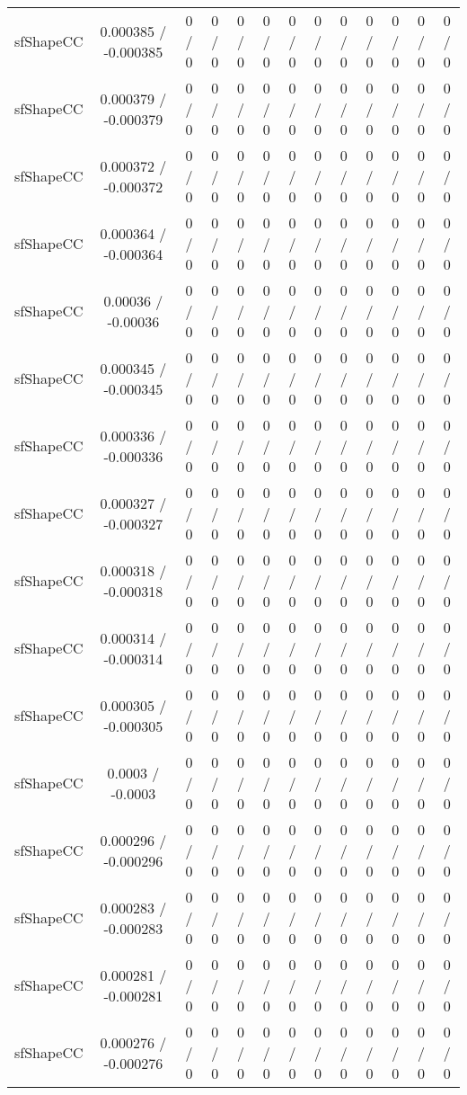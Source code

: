 \documentclass[10pt]{article}
\begin{document}
\begin{table}[htbp]
\begin{center}
\begin{tabular}{|c|c|c|c|c|c|c|c|c|c|c|c|c|}
  sfShapeCC & 0.000385 / -0.000385 & 0 / 0 & 0 / 0 & 0 / 0 & 0 / 0 & 0 / 0 & 0 / 0 & 0 / 0 & 0 / 0 & 0 / 0 & 0 / 0 & 0 / 0 \\ 
  sfShapeCC & 0.000379 / -0.000379 & 0 / 0 & 0 / 0 & 0 / 0 & 0 / 0 & 0 / 0 & 0 / 0 & 0 / 0 & 0 / 0 & 0 / 0 & 0 / 0 & 0 / 0 \\ 
  sfShapeCC & 0.000372 / -0.000372 & 0 / 0 & 0 / 0 & 0 / 0 & 0 / 0 & 0 / 0 & 0 / 0 & 0 / 0 & 0 / 0 & 0 / 0 & 0 / 0 & 0 / 0 \\ 
  sfShapeCC & 0.000364 / -0.000364 & 0 / 0 & 0 / 0 & 0 / 0 & 0 / 0 & 0 / 0 & 0 / 0 & 0 / 0 & 0 / 0 & 0 / 0 & 0 / 0 & 0 / 0 \\ 
  sfShapeCC & 0.00036 / -0.00036 & 0 / 0 & 0 / 0 & 0 / 0 & 0 / 0 & 0 / 0 & 0 / 0 & 0 / 0 & 0 / 0 & 0 / 0 & 0 / 0 & 0 / 0 \\ 
  sfShapeCC & 0.000345 / -0.000345 & 0 / 0 & 0 / 0 & 0 / 0 & 0 / 0 & 0 / 0 & 0 / 0 & 0 / 0 & 0 / 0 & 0 / 0 & 0 / 0 & 0 / 0 \\ 
  sfShapeCC & 0.000336 / -0.000336 & 0 / 0 & 0 / 0 & 0 / 0 & 0 / 0 & 0 / 0 & 0 / 0 & 0 / 0 & 0 / 0 & 0 / 0 & 0 / 0 & 0 / 0 \\ 
  sfShapeCC & 0.000327 / -0.000327 & 0 / 0 & 0 / 0 & 0 / 0 & 0 / 0 & 0 / 0 & 0 / 0 & 0 / 0 & 0 / 0 & 0 / 0 & 0 / 0 & 0 / 0 \\ 
  sfShapeCC & 0.000318 / -0.000318 & 0 / 0 & 0 / 0 & 0 / 0 & 0 / 0 & 0 / 0 & 0 / 0 & 0 / 0 & 0 / 0 & 0 / 0 & 0 / 0 & 0 / 0 \\ 
  sfShapeCC & 0.000314 / -0.000314 & 0 / 0 & 0 / 0 & 0 / 0 & 0 / 0 & 0 / 0 & 0 / 0 & 0 / 0 & 0 / 0 & 0 / 0 & 0 / 0 & 0 / 0 \\ 
  sfShapeCC & 0.000305 / -0.000305 & 0 / 0 & 0 / 0 & 0 / 0 & 0 / 0 & 0 / 0 & 0 / 0 & 0 / 0 & 0 / 0 & 0 / 0 & 0 / 0 & 0 / 0 \\ 
  sfShapeCC & 0.0003 / -0.0003 & 0 / 0 & 0 / 0 & 0 / 0 & 0 / 0 & 0 / 0 & 0 / 0 & 0 / 0 & 0 / 0 & 0 / 0 & 0 / 0 & 0 / 0 \\ 
  sfShapeCC & 0.000296 / -0.000296 & 0 / 0 & 0 / 0 & 0 / 0 & 0 / 0 & 0 / 0 & 0 / 0 & 0 / 0 & 0 / 0 & 0 / 0 & 0 / 0 & 0 / 0 \\ 
  sfShapeCC & 0.000283 / -0.000283 & 0 / 0 & 0 / 0 & 0 / 0 & 0 / 0 & 0 / 0 & 0 / 0 & 0 / 0 & 0 / 0 & 0 / 0 & 0 / 0 & 0 / 0 \\ 
  sfShapeCC & 0.000281 / -0.000281 & 0 / 0 & 0 / 0 & 0 / 0 & 0 / 0 & 0 / 0 & 0 / 0 & 0 / 0 & 0 / 0 & 0 / 0 & 0 / 0 & 0 / 0 \\ 
  sfShapeCC & 0.000276 / -0.000276 & 0 / 0 & 0 / 0 & 0 / 0 & 0 / 0 & 0 / 0 & 0 / 0 & 0 / 0 & 0 / 0 & 0 / 0 & 0 / 0 & 0 / 0 \\ 

\end{tabular}
\end{center}
\end{table}
\end{document}
